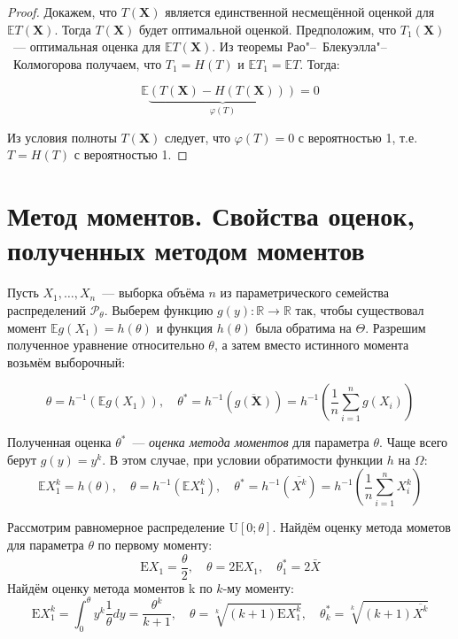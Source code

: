 \begin{proof}
Докажем, что $T(\mathbf{X})$ является единственной несмещённой оценкой для $\mathbb{E}T(\mathbf{X})$. Тогда $T(\mathbf{X})$ будет оптимальной оценкой. Предположим, что $T_1(\mathbf{X})$~--- оптимальная оценка для $\mathbb{E}T(\mathbf{X})$. Из теоремы Рао"--~Блекуэлла"--~Колмогорова получаем, что $T_{1}=H(T)$ и $\mathbb{E} T_{1}=\mathbb{E} T$. Тогда:

\begin{equation*}
    \mathbb{E} \underbrace{(T(\mathbf{X})-H(T(\mathbf{X})))}_{\varphi(T)}=0
\end{equation*}

Из условия полноты $T(\mathbf{X})$ следует, что $\varphi(T)=0$ с вероятностью 1, т.е. $T=H(T)$ с вероятностью 1.
\end{proof}

\section{Метод моментов. Свойства оценок, полученных методом моментов}

Пусть $X_1, \ldots, X_n$~--- выборка объёма $n$ из параметрического семейства распределений $\mathcal{P}_\theta$. Выберем функцию $g(y): \mathbb{R} \rightarrow \mathbb{R}$ так, чтобы существовал момент $\mathbb{E} g\left(X_{1}\right)=h(\theta)$ и функция $h(\theta)$ была обратима на $\Theta$. Разрешим полученное уравнение относительно $\theta$, а затем вместо истинного момента возьмём выборочный:

\begin{equation*}
    \theta=h^{-1}\left(\mathbb{E} g\left(X_{1}\right)\right), \quad \theta^{*}=h^{-1}(\overline{g(\mathbf{X})})=h^{-1}\left(\frac{1}{n} \sum\limits_{i=1}^{n} g\left(X_{i}\right)\right)
\end{equation*}

Полученная оценка $\theta^{*}$~--- {\it оценка метода моментов} для параметра $\theta$. Чаще всего берут $g(y)=y^{k}$. В этом случае, при условии обратимости функции $h$ на $\Omega$:
\begin{equation*}
    \mathbb{E} X_{1}^{k}=h(\theta), \quad \theta=h^{-1}\left(\mathbb{E} X_{1}^{k}\right), \quad \theta^{*}=h^{-1}(\overline{X^{k}})=h^{-1}\left(\frac{1}{n} \sum\limits_{i=1}^{n} X_{i}^{k}\right)
\end{equation*}

\begin{exmp}
    Рассмотрим равномерное распределение $\mathrm{U}[0;\theta]$. Найдём оценку метода мометов для параметра $\theta$ по первому моменту:
    \begin{equation*}
        \mathrm{E} X_{1}=\frac{\theta}{2}, \quad \theta=2 \mathrm{E} X_{1}, \quad \theta_{1}^{*}=2 \bar{X}
    \end{equation*}
    Найдём оценку метода моментов k по $k$-му моменту:
    \begin{equation*}
        \mathrm{E} X_{1}^{k}=\int_{0}^{\theta} y^{k} \frac{1}{\theta} d y=\frac{\theta^{k}}{k+1}, \quad \theta=\sqrt[k]{(k+1) \mathrm{E} X_{1}^{k}}, \quad \theta_{k}^{*}=\sqrt[k]{(k+1) \overline{X^{k}}}
    \end{equation*}
\end{exmp}

